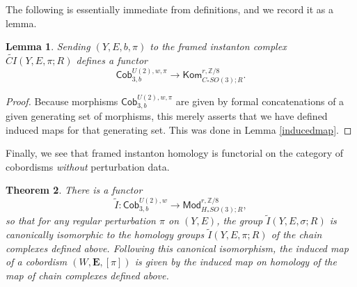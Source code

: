 \documentclass[10pt,a4paper]{amsart}
\newtheorem{theorem}{Theorem}
\newtheorem{lemma}[theorem]{Lemma}
\theoremstyle{definition}
\theoremstyle{remark}
\numberwithin{figure}{qchap}
\begin{document}
The following is essentially immediate from definitions, and we record it as a lemma. 

\begin{lemma}\label{framed-functor-broken}Sending $(Y,E,b,\pi)$ to the framed instanton complex $\widetilde{CI}(Y, E, \pi; R)$ defines a functor $$\mathsf{Cob}_{3,b}^{U(2),w,\pi} \to \mathsf{Kom}_{C_*SO(3);R}^{r,\mathbb Z/8}.$$
\end{lemma}
\begin{proof}Because morphisms $\mathsf{Cob}_{3,b}^{U(2),w,\pi}$ are given by formal concatenations of a given generating set of morphisms, this merely asserts that we have defined induced maps for that generating set. This was done in Lemma \ref{inducedmap}. 
\end{proof}

Finally, we see that framed instanton homology is functorial on the category of cobordisms \emph{without} perturbation data.


\begin{theorem}\label{framed-functor}There is a functor $$\widetilde I: \mathsf{Cob}_{3,b}^{U(2),w} \to \mathsf{Mod}_{H_*SO(3);R}^{r,\mathbb Z/8},$$ so that for any regular perturbation $\pi$ on $(Y,E)$, the group $\widetilde I(Y,E,\sigma;R)$ is canonically isomorphic to the homology groups $\widetilde I(Y, E, \pi;R)$ of the chain complexes defined above. Following this canonical isomorphism, the induced map of a cobordism $(W,\mathbf{E},[\pi])$ is given by the induced map on homology of the map of chain complexes defined above.
\end{theorem}
\end{document}
